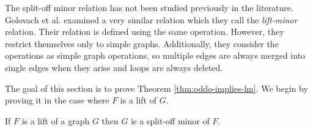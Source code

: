 \documentclass[11pt]{article}
\begin{document}
\par 
The split-off minor relation has not been studied previously in the literature. 
Golovach et al. \cite{GOLOVACH2014286} examined a very similar relation which they call the \emph{lift-minor} relation.
Their relation is defined using the same operation. However, they restrict themselves only to simple graphs. Additionally, they consider the operations as simple graph operations, so multiple edges are always merged into single edges when they arise and loops are always deleted.
\par 


The goal of this section is to prove Theorem \ref{thm:oddo-implies-lm}.
We begin by proving it in the case where $F$ is a lift of $G$.

\begin{lemma}
\label{lemma:perfect-matching-lm}
    If $F$ is a lift of a graph $G$ then $G$ is a split-off minor of $F$.
\end{lemma}
\end{document}

